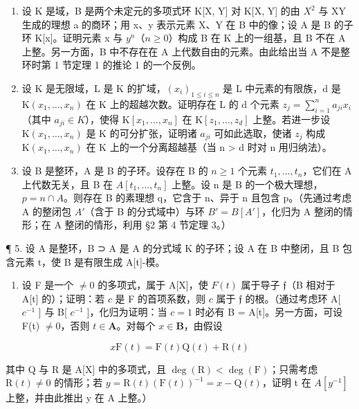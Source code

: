 \begin{enumerate}
\def\labelenumi{\arabic{enumi}.}
\setcounter{enumi}{1}
\item
  设 K 是域，B 是两个未定元的多项式环 K{[}X, Y{]} 对 K{[}X, Y{]} 的由 \(X^{2}\) 与 XY 生成的理想 a 的商环；用 x、y 表示元素 X、Y 在 B 中的像；设 A 是 B 的子环 K{[}x{]}。证明元素 x 与 \(y^{n}\)（\(n \geqslant 0\)）构成 B 在 K 上的一组基，且 B 不在 A 上整。另一方面，B 中不存在在 A 上代数自由的元素。由此给出当 A 不是整环时第 1 节定理 1 的推论 1 的一个反例。
\item
  设 K 是无限域，L 是 K 的扩域，\((x_{i})_{1 \leq i \leq n}\) 是 L 中元素的有限族，d 是 \(\mathrm{K}(x_{1}, \ldots, x_{n})\) 在 K 上的超越次数。证明存在 L 的 d 个元素 \(z_{j} = \sum_{i=1}^{n} a_{ji} x_{i}\)（其中 \(a_{ji} \in K\)），使得 \(\mathrm{K}[x_{1}, \ldots, x_{n}]\) 在 \(\mathrm{K}[z_{1}, \ldots, z_{d}]\) 上整。若进一步设 \(\mathrm{K}(x_{1}, \ldots, x_{n})\) 是 K 的可分扩张，证明诸 \(a_{ji}\) 可如此选取，使诸 \(z_{j}\) 构成 \(\mathrm{K}(x_{1}, \ldots, x_{n})\) 在 K 上的一个分离超越基（当 n \textgreater{} d 时对 n 用归纳法）。
\item
  设 B 是整环，A 是 B 的子环。设存在 B 的 \(n \geqslant 1\) 个元素 \(t_{1}, \ldots, t_{n}\)，它们在 A 上代数无关，且 B 在 \(A[t_{1}, \ldots, t_{n}]\) 上整。设 n 是 B 的一个极大理想，\(p = n \cap A\)。则存在 B 的素理想 q，它含于 n、异于 n 且包含 p。（先通过考虑 A 的整闭包 \(A'\)（含于 B 的分式域中）与环 \(B' = B[A']\)，化归为 A 整闭的情形；在 A 整闭的情形，利用 §2 第 4 节定理 3。）
\end{enumerate}

¶ 5. 设 A 是整环，B ⊃ A 是 A 的分式域 K 的子环；设 A 在 B 中整闭，且 B 包含元素 t，使 B 是有限生成 A{[}t{]}-模。

\begin{enumerate}
\def\labelenumi{(\alph{enumi})}
\tightlist
\item
  设 F 是一个 \(\neq 0\) 的多项式，属于 A{[}X{]}，使 \(F(t)\) 属于导子 \(\mathfrak{f}\)（B 相对于 A{[}t{]} 的）；证明：若 \(c\) 是 F 的首项系数，则 \(c\) 属于 \(\mathfrak{f}\) 的根。（通过考虑环 A{[} \(c^{-1}\) {]} 与 B{[} \(c^{-1}\) {]}，化归为证明：当 \(c = 1\) 时必有 B = A{[}t{]}。另一方面，可设 F(t) \(\neq 0\)，否则 \(t \in \mathbf{A}\)。对每个 \(x \in \mathbf{B}\)，由假设
\end{enumerate}

\[
x \mathrm{F} (t) = \mathrm{F} (t) \mathrm{Q} (t) + \mathrm{R} (t)
\]

其中 Q 与 R 是 A{[}X{]} 中的多项式，且 \(\deg(\mathrm{R}) < \deg(\mathrm{F})\)；只需考虑 \(\mathrm{R}(t) \neq 0\) 的情形；若 \(y = \mathrm{R}(t)(\mathrm{F}(t))^{-1} = x - \mathrm{Q}(t)\)，证明 t 在 \(A[y^{-1}]\) 上整，并由此推出 y 在 A 上整。）

